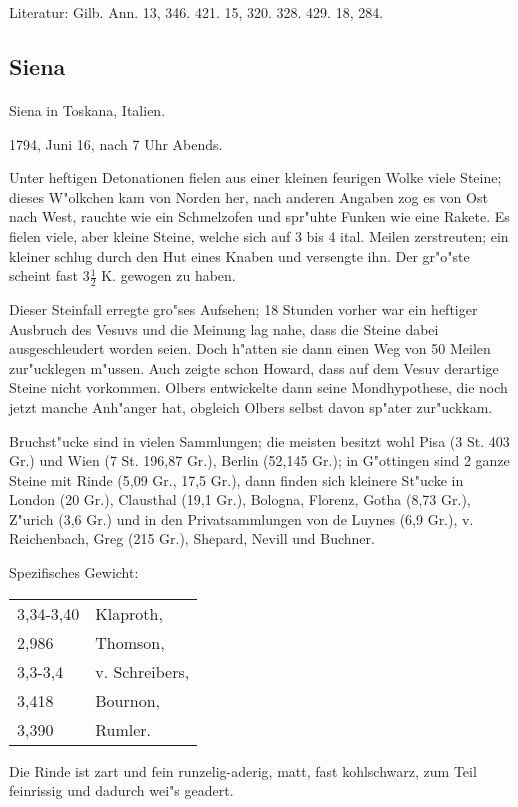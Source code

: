 \documentclass[a4paper, 11pt, oneside]{article}
\begin{document}
\footnotesize
Literatur: Gilb. Ann. 13, 346. 421. 15, 320. 328. 429. 18, 284.
\subsection{Siena}
\normalsize
\paragraph{}
Siena in Toskana, Italien.

1794, Juni 16, nach 7 Uhr Abends.

Unter heftigen Detonationen fielen aus einer kleinen feurigen Wolke viele Steine; dieses W"olkchen kam von Norden her, nach anderen Angaben zog es von Ost nach West, rauchte wie ein Schmelzofen und spr"uhte Funken wie eine Rakete. Es fielen viele, aber kleine Steine, welche sich auf 3 bis 4 ital. Meilen zerstreuten; ein kleiner schlug durch den Hut eines Knaben und versengte ihn. Der gr"o"ste scheint fast $3\frac{1}{2}$ K. gewogen zu haben.

Dieser Steinfall erregte gro"ses Aufsehen; 18 Stunden vorher war ein heftiger Ausbruch des Vesuvs und die Meinung lag nahe, dass die Steine dabei ausgeschleudert worden seien. Doch h"atten sie dann einen Weg von 50 Meilen zur"ucklegen m"ussen. Auch zeigte schon Howard, dass auf dem Vesuv derartige Steine nicht vorkommen. Olbers entwickelte dann seine Mondhypothese, die noch jetzt manche Anh"anger hat, obgleich Olbers selbst davon sp"ater zur"uckkam.

Bruchst"ucke sind in vielen Sammlungen; die meisten besitzt wohl Pisa (3 St. 403 Gr.) und Wien (7 St. 196,87 Gr.), Berlin (52,145 Gr.); in G"ottingen sind 2 ganze Steine mit Rinde (5,09 Gr., 17,5 Gr.), dann finden sich kleinere St"ucke in London (20 Gr.), Clausthal (19,1 Gr.), Bologna, Florenz, Gotha (8,73 Gr.), Z"urich (3,6 Gr.) und in den Privatsammlungen von de Luynes (6,9 Gr.), v. Reichenbach, Greg (215 Gr.), Shepard, Nevill und Buchner.

Spezifisches Gewicht:
\begin{table}[!ht]
    \centering
    \begin{tabular}{l l}
        3,34-3,40 & Klaproth,\\
        2,986 & Thomson,\\
        3,3-3,4 & v. Schreibers,\\
        3,418 & Bournon,\\
        3,390 & Rumler.
    \end{tabular}
\end{table}
Die Rinde ist zart und fein runzelig-aderig, matt, fast kohlschwarz, zum Teil feinrissig und dadurch wei"s geadert.
\end{document}
